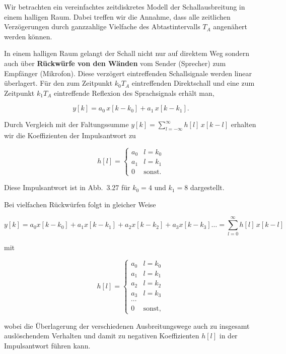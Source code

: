 \begin{beispiel}

Wir betrachten ein vereinfachtes zeitdiskretes Modell der Schallausbreitung in einem halligen Raum. Dabei treffen wir die Annahme, dass alle zeitlichen Verzögerungen durch ganzzahlige Vielfache des Abtastintervalls $T_A$ angenähert werden können.


In einem halligen Raum gelangt der Schall nicht nur auf direktem Weg sondern auch über \textbf{Rückwürfe von den Wänden} vom Sender (Sprecher) zum Empfänger (Mikrofon). Diese verzögert eintreffenden Schallsignale werden linear überlagert. Für den zum Zeitpunkt $k_0 T_A$ eintreffenden Direktschall und eine zum Zeitpunkt $k_1 T_A$ eintreffende Reflexion des Sprachsignals erhält man,

$$
y[k] = a_0\,x[k - k_0] + a_1\,x[k - k_1].
$$

Durch Vergleich mit der Faltungssumme $y[k] = \sum_{l=-\infty}^{\infty} h[l]\,x[k-l]$ erhalten wir die Koeffizienten der Impulsantwort zu

$$
h[l] = \begin{cases} a_0 & l = k_0 \\ a_1 & l = k_1 \\ 0 & \text{sonst.} \end{cases}
$$

Diese Impulsantwort ist in Abb.\ 3.27 für $k_0 = 4$ und $k_1 = 8$ dargestellt.


Bei vielfachen Rückwürfen folgt in gleicher Weise

$$
y[k] = a_0 x[k-k_0] + a_1 x[k-k_1] + a_2 x[k-k_2] + a_3 x[k-k_3] \ldots = \sum_{l=0}^{\infty} h[l]\,x[k-l]
$$

mit

$$
h[l] = \begin{cases} a_0 & l = k_0 \\ a_1 & l = k_1 \\ a_2 & l = k_2 \\ a_3 & l = k_3 \\ \cdots \\ 0 & \mathrm{sonst,} \end{cases}
$$

wobei die Überlagerung der verschiedenen Ausbreitungswege auch zu insgesamt auslöschendem Verhalten und damit zu negativen Koeffizienten $h[l]$ in der Impulsantwort führen kann.


\end{beispiel}
